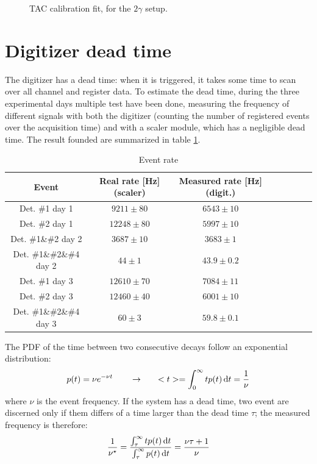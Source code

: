 \documentclass[11pt,a4 paper]{article}
\let\oldfrac\frac
\renewcommand{\frac}[3][d]{\ifthenelse{\equal{#1}{d}}{\oldfrac{#2}{#3}}{\nicefrac{#2}{#3}}}
\begin{document}
\begin{figure}[H]
    \centering
    \caption{TAC calibration fit, for the $2\gamma$ setup.}
    \label{fig:tac_calibr_fit}
\end{figure}



\section{Digitizer dead time}
The digitizer has a dead time: when it is triggered, it takes some time to scan over all channel and register data. To estimate the dead time, during the three experimental days multiple test have been done, measuring the frequency of different signals with both the digitizer (counting the number of registered events over the acquisition time) and with a scaler module, which has a negligible dead time. The result founded are summarized in table \ref{tab:rate}.

\begin{table}[H]
    \centering
    \begin{tabular}{cccccccc}
        \toprule
        Event & Real rate [\si{Hz}] (scaler)& Measured rate [\si{Hz}] (digit.) \\
        \midrule
        Det. \#1 day 1& $9211 \pm 80$ & $6543 \pm 10$ \\
        Det. \#2 day 1& $12248 \pm 80$ & $5997 \pm 10$\\
        Det. \#1\&\#2 day 2& $3687 \pm 10$ & $3683 \pm 1$ \\
        Det. \#1\&\#2\&\#4 day 2& $44 \pm 1$ & $43.9 \pm 0.2$ \\
        Det. \#1 day 3& $12610 \pm 70$ & $7084 \pm 11$ \\
        Det. \#2 day 3& $12460 \pm 40$ & $6001 \pm 10$ \\
        Det. \#1\&\#2\&\#4 day 3& $60 \pm 3$ & $59.8 \pm 0.1$ \\
        \bottomrule
    \end{tabular}
    \caption{Event rate}
    \label{tab:rate}
\end{table}

The PDF of the time between two consecutive decays follow an exponential distribution:
\begin{equation*}
    p(t) = \nu e^{-\nu t} \qquad \rightarrow \qquad <t> = \int_0^{\infty} tp(t) \dd{t} = \frac{1}{\nu}
\end{equation*}
where $\nu$ is the event frequency. If the system has a dead time, two event are discerned only if them differs of a time larger than the dead time $\tau$; the measured frequency is therefore:
\begin{equation*}
    \frac{1}{\nu^\star} = \frac{\int_{\tau}^{\infty} t p(t) \dd{t}}{\int_{\tau}^{\infty} p(t) \dd{t}} =\frac{\nu\tau + 1}{\nu}
\end{equation*}
\end{document}
